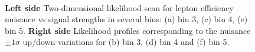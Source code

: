 \begin{figure}[htb]
\\

\caption{{\bf Left side} Two-dimensional likelihood scan for lepton efficiency nuisance vs signal strengths in several bins: (a) bin 3, (c) bin 4, (e) bin 5. {\bf Right side} Likelihood profiles corresponding to the nuisance $\pm 1 \sigma$ up/down variations for (b) bin 3, (d) bin 4 and (f) bin 5.\label{fig:eff_l_bananas_p2}}
\end{figure}


